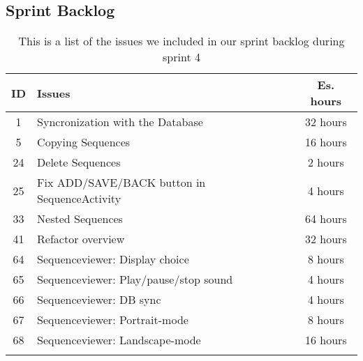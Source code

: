 \subsection{Sprint Backlog}\label{subsec:spr4_sprblog}
\begin{longtable} { | c | p{12cm} | c | } 
\hline
	ID 	&	Issues	&	Es. hours  \\\hline
	1	& 	Syncronization with the Database		&	32 hours  \\\hline
	5	& 	Copying Sequences		&	16 hours  \\\hline
	24	& 	Delete Sequences		&	2 hours  \\\hline
	25	& 	Fix ADD/SAVE/BACK button in SequenceActivity		&	4 hours  \\\hline
	33	& 	Nested Sequences		&	64 hours  \\\hline
	41	& 	Refactor overview		&	32 hours  \\\hline
	64	& 	Sequenceviewer: Display choice		&	8 hours  \\\hline
	65	& 	Sequenceviewer: Play/pause/stop sound		&	4 hours  \\\hline
	66	& 	Sequenceviewer: DB sync		&	4 hours  \\\hline
	67	& 	Sequenceviewer: Portrait-mode		&	8 hours  \\\hline
	68	& 	Sequenceviewer: Landscape-mode	&	16 hours  \\\hline
\caption{This is a list of the issues we included in our sprint backlog during sprint 4}
\label{tab:spr4_sprintblog}
\end{longtable}